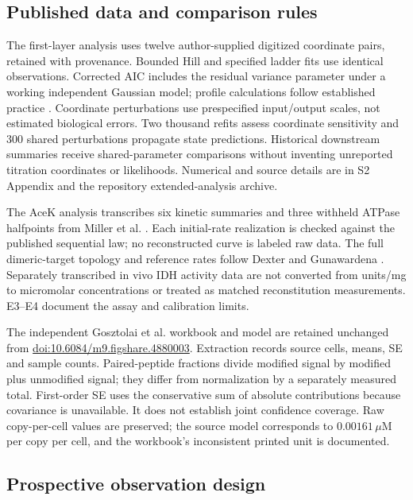 \documentclass[10pt,letterpaper]{article}
\begin{document}
\subsection*{Published data and comparison rules}

The first-layer analysis uses twelve author-supplied digitized coordinate pairs, retained with provenance. Bounded Hill and specified ladder fits use identical observations. Corrected AIC includes the residual variance parameter under a working independent Gaussian model; profile calculations follow established practice \cite{r74}. Coordinate perturbations use prespecified input/output scales, not estimated biological errors. Two thousand refits assess coordinate sensitivity and 300 shared perturbations propagate state predictions. Historical downstream summaries receive shared-parameter comparisons without inventing unreported titration coordinates or likelihoods. Numerical and source details are in S2 Appendix and the repository extended-analysis archive.

The AceK analysis transcribes six kinetic summaries and three withheld ATPase halfpoints from Miller et al. \cite{r83}. Each initial-rate realization is checked against the published sequential law; no reconstructed curve is labeled raw data. The full dimeric-target topology and reference rates follow Dexter and Gunawardena \cite{r84}. Separately transcribed in vivo IDH activity data \cite{r85} are not converted from units/mg to micromolar concentrations or treated as matched reconstitution measurements. E3--E4 document the assay and calibration limits.

The independent Gosztolai et al. workbook and model are retained unchanged from \href{https://doi.org/10.6084/m9.figshare.4880003}{doi:10.6084/m9.figshare.4880003}. Extraction records source cells, means, SE and sample counts. Paired-peptide fractions divide modified signal by modified plus unmodified signal; they differ from normalization by a separately measured total. First-order SE uses the conservative sum of absolute contributions because covariance is unavailable. It does not establish joint confidence coverage. Raw copy-per-cell values are preserved; the source model corresponds to $0.00161\,\mu$M per copy per cell, and the workbook's inconsistent printed unit is documented.

\subsection*{Prospective observation design}
\end{document}
